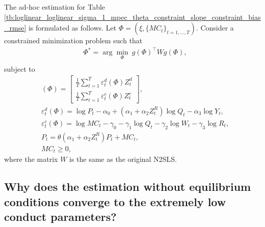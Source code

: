 \documentclass[11pt, a4paper]{article}
\theoremstyle{remark}
\begin{document}
The ad-hoc estimation for Table \ref{tb:loglinear_loglinear_sigma_1_mpec_theta_constraint_slope_constraint_bias_rmse} is formulated as follows.
Let $\Phi = (\xi, \{MC_t\}_{t = 1,\ldots, T})$.
Consider a constrained minimization problem such that 
\begin{align}
         &\Phi^{*} = \arg\min_{\Phi}\ g(\Phi)^\top W g(\Phi),\\
\end{align}
subject to
\begin{align}
     &(\Phi) = \left[\begin{array}{l}
    \frac{1}{T}\sum_{t=1}^T{\varepsilon}^{d}_{t}(\Phi)Z_{t}^{d} \\
    \frac{1}{T}\sum_{t=1}^T{\varepsilon}^{c}_{t}(\Phi)Z_{t}^{c}
    \end{array}\right],\\ 
    & {\varepsilon}_t^d(\Phi) =  \log P_{t} - \alpha_0 + (\alpha_1 + \alpha_2 Z^{R}_{t}) \log Q_t - \alpha_3 \log Y_t, \\
    & {\varepsilon}_t^c(\Phi) =  \log MC_t -\gamma_0 - \gamma_1 \log Q_t -  \gamma_2 \log W_{t} -\gamma_3 \log R_t, \\
    & P_{t} = \theta(\alpha_1 + \alpha_2 Z^{R}_t)P_{t} + MC_{t},\\
    & MC_t \ge 0,
\end{align}
where the matrix $W$ is the same as the original N2SLS.





\subsection{Why does the estimation without equilibrium conditions converge to the extremely low conduct parameters?}\label{appendix:implausible_estimator}
\end{document}
